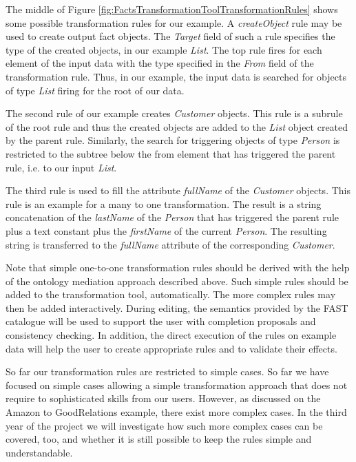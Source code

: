 The middle of Figure \ref{fig:FactsTransformationToolTransformationRules} shows some possible transformation rules for our example. A \textit{createObject} rule may be used to create output fact objects. The \textit{Target} field of such a rule specifies the type of the created objects, in our example \textit{List}. The top rule fires for each element of the input data with the type specified in the \textit{From} field of the transformation rule. Thus, in our example, the input data is searched for objects of type \textit{List} firing for the root of our data. 

The second rule of our example creates \textit{Customer} objects. This rule is a subrule of the root rule and thus the created objects are added to the \textit{List} object created by the parent rule. Similarly, the search for triggering objects of type \textit{Person} is restricted to the subtree below the from element that has triggered the parent rule, i.e. to our input \textit{List}. 

The third rule is used to fill the attribute \textit{fullName} of the \textit{Customer} objects. This rule is an example for a many to one transformation. The result is a string concatenation of the \textit{lastName} of the \textit{Person} that has triggered the parent rule plus a text constant plus the \textit{firstName} of the current \textit{Person}. The resulting string is transferred to the \textit{fullName} attribute of the corresponding \textit{Customer}. 

Note that simple one-to-one transformation rules should be derived with the help of the ontology mediation approach described above. Such simple rules should be added to the transformation tool, automatically. The more complex rules may then be added interactively. During editing, the semantics provided by the FAST catalogue will be used to support the user with completion proposals and consistency checking. In addition, the direct execution of the rules on example data will help the user to create appropriate rules and to validate their effects. 

So far our transformation rules are restricted to simple cases. So far we have focused on simple cases allowing a simple transformation approach that does not require to sophisticated skills from our users. However, as discussed on the Amazon to GoodRelations example, there exist more complex cases. In the third year of the project we will investigate how such more complex cases can be covered, too, and whether it is still possible to keep the rules simple and understandable. 



